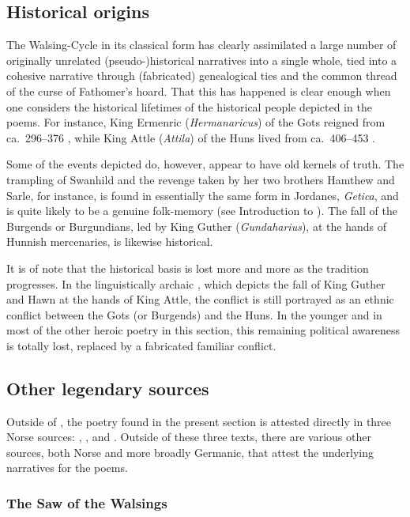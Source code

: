 \subsection{Historical origins}

The Walsing-Cycle in its classical form has clearly assimilated a large number of originally unrelated (pseudo-)historical narratives into a single whole, tied into a cohesive narrative through (fabricated) genealogical ties and the common thread of the curse of Fathomer’s hoard.  That this has happened is clear enough when one considers the historical lifetimes of the historical people depicted in the poems.  For instance, King Ermenric (\emph{Hermanaricus}) of the Gots reigned from ca.~296--376 \ce, while King Attle (\emph{Attila}) of the Huns lived from ca.~406--453 \ce.

Some of the events depicted do, however, appear to have old kernels of truth.  The trampling of Swanhild and the revenge taken by her two brothers Hamthew and Sarle, for instance, is found in essentially the same form in Jordanes, \emph{Getica}, and is quite likely to be a genuine folk-memory (see Introduction to ).  The fall of the Burgends or Burgundians, led by King Guther (\emph{Gundaharius}), at the hands of Hunnish mercenaries, is likewise historical.

It is of note that the historical basis is lost more and more as the tradition progresses.  In the linguistically archaic , which depicts the fall of King Guther and Hawn at the hands of King Attle, the conflict is still portrayed as an ethnic conflict between the Gots (or Burgends) and the Huns.  In the younger  and in most of the other heroic poetry in this section, this remaining political awareness is totally lost, replaced by a fabricated familiar conflict.

\subsection{Other legendary sources}

Outside of \Regius, the poetry found in the present section is attested directly in three Norse sources: \VolsungaSaga, \Nornagest, and \Skaldskaparmal.  Outside of these three texts, there are various other sources, both Norse and more broadly Germanic, that attest the underlying narratives for the poems.

\subsubsection{The Saw of the Walsings}

